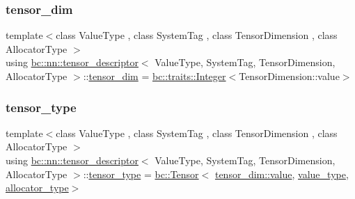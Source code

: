 \subsubsection{\texorpdfstring{tensor\+\_\+dim}{tensor\_dim}}
{\footnotesize\ttfamily template$<$class Value\+Type , class System\+Tag , class Tensor\+Dimension , class Allocator\+Type $>$ \\
using \hyperlink{structbc_1_1nn_1_1tensor__descriptor}{bc\+::nn\+::tensor\+\_\+descriptor}$<$ Value\+Type, System\+Tag, Tensor\+Dimension, Allocator\+Type $>$\+::\hyperlink{structbc_1_1nn_1_1tensor__descriptor_ae2cb1d96346b40d67764bd9daf726f74}{tensor\+\_\+dim} =  \hyperlink{structbc_1_1traits_1_1Integer}{bc\+::traits\+::\+Integer}$<$Tensor\+Dimension\+::value$>$}

\mbox{\label{structbc_1_1nn_1_1tensor__descriptor_ae5e9727a4ae20a76ed4b87ed8c386468}} 
\subsubsection{\texorpdfstring{tensor\+\_\+type}{tensor\_type}}
{\footnotesize\ttfamily template$<$class Value\+Type , class System\+Tag , class Tensor\+Dimension , class Allocator\+Type $>$ \\
using \hyperlink{structbc_1_1nn_1_1tensor__descriptor}{bc\+::nn\+::tensor\+\_\+descriptor}$<$ Value\+Type, System\+Tag, Tensor\+Dimension, Allocator\+Type $>$\+::\hyperlink{structbc_1_1nn_1_1tensor__descriptor_ae5e9727a4ae20a76ed4b87ed8c386468}{tensor\+\_\+type} =  \hyperlink{namespacebc_a659391e47ab612be3ba6c18cf9c89159}{bc\+::\+Tensor}$<$ \hyperlink{structbc_1_1traits_1_1Integer_a853b05936b98e64c79163395c3624e32}{tensor\+\_\+dim\+::value}, \hyperlink{structbc_1_1nn_1_1tensor__descriptor_a50cff589c12e4da21525c0ebb04dc54d}{value\+\_\+type}, \hyperlink{structbc_1_1nn_1_1tensor__descriptor_aeca4d7720d1a19acea4d9166e3af80a3}{allocator\+\_\+type}$>$}

\mbox{\label{structbc_1_1nn_1_1tensor__descriptor_a50cff589c12e4da21525c0ebb04dc54d}} 
